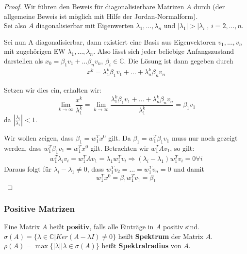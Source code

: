 \documentclass[]{article}
\begin{document}
\begin{proof}
	Wir führen den Beweis für diagonalisierbare Matrizen $A$ durch (der allgemeine Beweis ist möglich mit Hilfe der Jordan-Normalform). \\
	Sei also $A$ diagonalisierbar mit Eigenwerten $\lambda_1, \dotsc, \lambda_n$ und $|\lambda_1| > |\lambda_i|$, $i=2, \dots, n$.
	
	Sei nun A diagonalisierbar, dann existiert eine Basis aus Eigenvektoren $v_1, \dots, v_n$ mit zugehörigen EW $\lambda_1, \dots , \lambda_n$. Also lässt sich jeder beliebige Anfangszustand darstellen als $x_0 = \beta_1 v_1 + \dots \beta_n v_n $, $\beta_i \in \mathbb{C}$. Die Lösung ist dann gegeben durch
	\begin{align*}
		x^k= \lambda_1^k \beta_1 v_1 + \dots + \lambda_n^k \beta_n v_n
	\end{align*} 	
	
	Setzen wir dies ein, erhalten wir: 
	\begin{equation*}
	\lim_{k \to \infty} \frac{x^k}{\lambda_1^k} =  \lim_{k \to \infty} \frac{\lambda_1^k \beta_1 v_1 + \dots + \lambda_n^k \beta_n v_n}{\lambda_1^k} = \beta_1 v_1
	\end{equation*}	
	da $|\frac{\lambda_i}{\lambda_1}|<1$. 
	
	Wir wollen zeigen, dass $\beta_1=w_1^T x^0 $ gilt. 
	Da $\beta_1 = w_1^T \beta_1  v_1$ muss nur noch gezeigt werden, dass $ w_1^T \beta_1  v_1 = w_1^T x^0$ gilt. Betrachten wir $w_1^T  A v_1$, so gilt: 
	\begin{align*}
		w_1^T \lambda_i v_i = w_1^T  A v_1 = \lambda_1 w_1^T v_i \Rightarrow
		(\lambda_i - \lambda_1) w_1^T v_i = 0 \forall i
	\end{align*}
	Daraus folgt für  $\lambda_i - \lambda_1 \neq 0$, dass $w_1^T v_2 = \dots = w_1^T v_n = 0$ und damit
	\[ w_1^T x^0 = \beta_1 w_1^T v_1 = \beta_1 \]
\end{proof}

\subsubsection*{Positive Matrizen}
Eine Matrix $A$ heißt \textbf{positiv}, falls alle Einträge in $A$ positiv sind. \\
$\sigma(A) = \{ \lambda \in \mathbb{C} | Ker(A - \lambda I) \neq 0 \}$ heißt \textbf{Spektrum} der Matrix $A$. \\
$\rho(A) = \max \{|\lambda| | \lambda \in \sigma(A) \}$ heißt \textbf{Spektralradius} von $A$.
\end{document}
